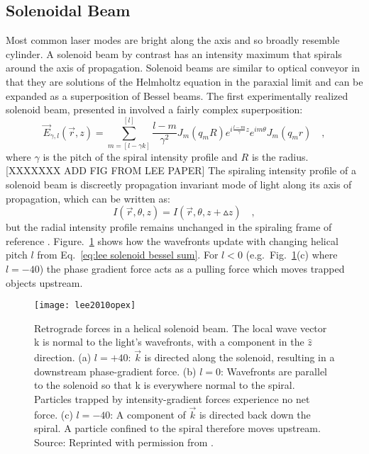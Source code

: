 \subsection{Solenoidal Beam}
Most common laser modes are bright along the axis and so broadly resemble cylinder. A solenoid beam by contrast has an  intensity maximum that spirals around the axis of propagation. Solenoid beams are similar to optical conveyor in that they are solutions of the Helmholtz equation in the paraxial limit and  can be expanded as a superposition of Bessel beams. The first experimentally realized solenoid beam, presented in \cite{Lee:10} involved a fairly complex superposition:
\begin{equation}
\label{eq:lee solenoid bessel sum}
\vec{E}_{\gamma, l}(\vec{r},z) = \sum ^{[l]}_{m=[l-\gamma k]}\frac{l-m}{\gamma ^2}J_{m}(q_m R)e^{i\frac{l-m}{\gamma}z}e^{im\theta}J_{m}(q_m r) \quad ,
\end{equation}
where $\gamma$ is the pitch of the spiral intensity profile and $R$ is the radius. [XXXXXXX ADD FIG FROM LEE PAPER]
The spiraling intensity profile of a solenoid beam is discreetly propagation invariant mode of light along its axis of propagation, which can be written as:
\begin{equation}
\label{eq:discreet propagation invariant}
I\left(\vec{r},\theta, z\right) = I\left(\vec{r},\theta, z+\vartriangle z\right) \quad ,
\end{equation}
but the radial intensity profile remains unchanged in the spiraling frame of reference \cite{Tervo01}. Figure.~\ref{fig:solenoid wavefronts} shows how the wavefronts update with changing helical pitch $l$ from Eq.~\eqref{eq:lee solenoid bessel sum}. For $l<0$ (e.g.~Fig.~\ref{fig:solenoid wavefronts}(c) where $l=-40$) the phase gradient force acts as a pulling force which moves trapped objects upstream.
\begin{figure}[t!]
  \centering
  \texttt{[image: lee2010opex]}
  \caption{Retrograde forces in a helical solenoid beam. The local wave vector k is normal to the light's wavefronts, with a component in the $\hat{z}$ direction. (a) $l = +40$: $\vec{k}$ is directed along the solenoid, resulting in a downstream phase-gradient force. (b) $l = 0$: Wavefronts are parallel to the solenoid so that k is everywhere normal to the spiral. Particles trapped by intensity-gradient forces experience no net force. (c) $l = -40$: A component of $\vec{k}$ is directed back down the spiral. A particle confined to the spiral therefore moves upstream. Source: Reprinted with permission from \cite{Lee:10}.}
  \label{fig:solenoid wavefronts}
\end{figure}


